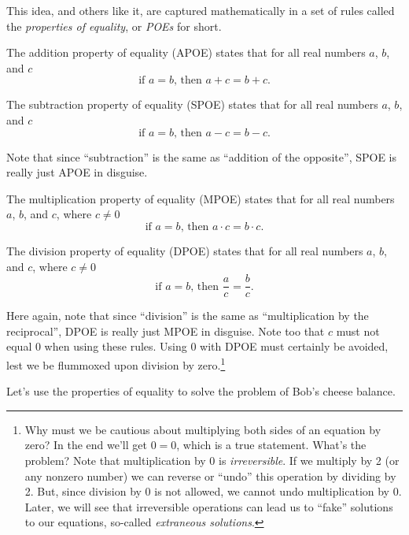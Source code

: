 This idea, and others like it, are captured mathematically in a set of rules called the \textit{properties of equality}, or \textit{POEs} for short.

\begin{boxdef2col}
\raggedright %
The \gls{addition property of equality} (APOE) states that for all real numbers $a$, $b$, and $c$ \[\text{if } a = b \text{, then } a + c = b + c.\]
\tcblower
\raggedright %
The \gls{subtraction property of equality} (SPOE) states that for all real numbers $a$, $b$, and $c$\[\text{if } a = b \text{, then } a - c = b - c.\]
\end{boxdef2col}

Note that since ``subtraction'' is the same as ``addition of the opposite'', SPOE is really just APOE in disguise.

\begin{boxdef2col}
\raggedright %
The \gls{multiplication property of equality} (MPOE) states that for all real numbers $a$, $b$, and $c$, where $c\neq 0$ \[\text{if } a = b \text{, then } a \cdot c = b \cdot c.\]
\tcblower
\raggedright %
The \gls{division property of equality} (DPOE) states that for all real numbers $a$, $b$, and $c$, where $c\neq 0$ \[\text{if } a = b \text{, then } \frac{a}{c} = \frac{b}{c}.\]
\end{boxdef2col}

Here again, note that since ``division'' is the same as ``multiplication by the reciprocal'', DPOE is really just MPOE in disguise. Note too that $c$ must not equal 0 when using these rules. Using 0 with DPOE must certainly be avoided, lest we be flummoxed upon division by zero.\footnote{Why must we be cautious about multiplying both sides of an equation by zero? In the end we'll get $0=0$, which is a true statement. What's the problem? Note that multiplication by 0 is \textit{irreversible}. If we multiply by 2 (or any nonzero number) we can reverse or ``undo'' this operation by dividing by 2. But, since division by 0 is not allowed, we cannot undo multiplication by 0. Later, we will see that irreversible operations can lead us to ``fake'' solutions to our equations, so-called \textit{extraneous solutions}.}

Let's use the properties of equality to solve the problem of Bob's cheese balance.

